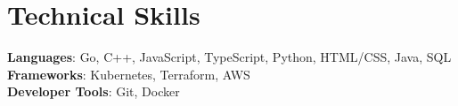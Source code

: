 \documentclass[letterpaper,11pt]{article}
\begin{document}
%
\section{Technical Skills}
 \begin{itemize}[leftmargin=0.15in, label={}]
    \small{\item{
     \textbf{Languages}{: Go, C++, JavaScript, TypeScript, Python, HTML/CSS, Java, SQL } \\
     \textbf{Frameworks}{: Kubernetes, Terraform, AWS } \\
     \textbf{Developer Tools}{: Git, Docker }
    }}
 \end{itemize}


\end{document}
